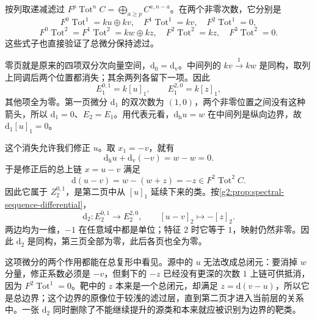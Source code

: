 \ProseParagraphBreak

按列取递减滤过 \(F^p\operatorname{Tot}^nC=\bigoplus_{a\ge p}C^{a,n-a}\)。在两个非零次数，它分别是
\[
	F^0\operatorname{Tot}^1=ku\oplus kv,\quad F^1\operatorname{Tot}^1=kv,\quad F^2\operatorname{Tot}^1=0,
\]
\[
	F^0\operatorname{Tot}^2=F^1\operatorname{Tot}^2=kw\oplus kz,\quad F^2\operatorname{Tot}^2=kz,\quad F^3\operatorname{Tot}^2=0.
\]
这些式子也直接验证了总微分保持滤过。

\ProseParagraphBreak

零页就是原来的四项双分次向量空间，\(\mathrm d_0=\mathrm d_{\mathrm v}\)。中间列的 \(kv\xrightarrow{1}kw\) 是同构，取列上同调后两个位置都消失；其余两列各留下一项。因此
\[
	E_1^{0,1}=k[u]_1,\qquad E_1^{2,0}=k[z]_1,
\]
其他项全为零。第一页微分 \(\mathrm d_1\) 的双次数为 \((1,0)\)，两个非零位置之间没有这种箭头，所以 \(\mathrm d_1=0\)、\(E_2=E_1\)。用代表元看，\(\mathrm d_{\mathrm h}u=w\) 在中间列是纵向边界，故 \(\mathrm d_1[u]_1=0\)。

\ProseParagraphBreak

这个消失允许我们修正 \(u\)。取 \(x_1=-v\)，就有
\[
	\mathrm d_{\mathrm h}u+\mathrm d_{\mathrm v}(-v)=w-w=0.
\]
于是修正后的总上链 \(x=u-v\) 满足
\begin{equation}\label{g2:eq:nonzero-d2-corrected-representative}
	\mathrm d(u-v)=w-(w+z)=-z\in F^2\operatorname{Tot}^2C.
\end{equation}
因此它属于 \(Z_2^{0,1}\)，是第二页中从 \([u]_1\) 延续下来的类。按\cref{g2:prop:spectral-sequence-differential}，
\begin{equation}\label{g2:eq:nonzero-d2-value}
	\mathrm d_2:E_2^{0,1}\longrightarrow E_2^{2,0},\qquad [u-v]_2\longmapsto-[z]_2.
\end{equation}
两边均为一维，\(-1\) 在任意域中都是单位；特征 \(2\) 时它等于 \(1\)，映射仍然非零。因此 \(\mathrm d_2\) 是同构，第三页全部为零，此后各页也全为零。

\ProseParagraphBreak

这项微分的两个作用都能在总复形中看见。源中的 \(u\) 无法改成总闭元：要消掉 \(w\) 分量，修正系数必须是 \(-v\)，但剩下的 \(-z\) 已经没有更深的次数 \(1\) 上链可供抵消，因为 \(F^2\operatorname{Tot}^1=0\)。靶中的 \(z\) 本来是一个总闭元，却满足 \(z=\mathrm d(v-u)\)，所以它是总边界；这个边界的原像位于较浅的滤过层，直到第二页才进入当前层的关系中。一张 \(\mathrm d_2\) 同时删除了不能继续提升的源类和本来就应被识别为边界的靶类。

\ProseParagraphBreak

